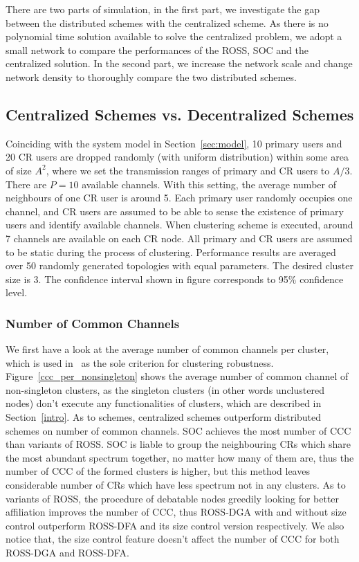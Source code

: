 There are two parts of simulation, in the first part, we investigate the gap between the distributed schemes with the centralized scheme.
As there is no polynomial time solution available to solve the centralized problem, we adopt a small network to compare the performances of the ROSS, SOC and the centralized solution.
In the second part, we increase the network scale and change network density to thoroughly compare the two distributed schemes.
\subsection{Centralized Schemes vs. Decentralized Schemes}
Coinciding with the system model in Section~\ref{sec:model}, 10 primary users and 20 CR users are dropped randomly (with uniform distribution) within some area of size $A^{2}$, where we set the transmission ranges of primary and CR users to $A/3$. There are $P=10$ available channels. 
With this setting, the average number of neighbours of one CR user is around 5.
Each primary user randomly occupies one channel, and CR users are assumed to be able to sense the existence of primary users and identify available channels.
When clustering scheme is executed, around 7 channels are available on each CR node.
All primary and CR users are assumed to be static during the process of clustering.
Performance results are averaged over 50 randomly generated topologies with equal parameters.
The desired cluster size is 3.
The confidence interval shown in figure corresponds to 95\% confidence level.

\subsubsection*{Number of Common Channels}
\label{ccc_20}
We first have a look at the average number of common channels per cluster, which is used in~\cite{LIU_TMC11_2} as the sole criterion for clustering robustness.
Figure~\ref{ccc_per_nonsingleton} shows the average number of common channel of non-singleton clusters, as the singleton clusters (in other words unclustered nodes) don't execute any functionalities of clusters, which are described in Section~\ref{intro}.
As to schemes, centralized schemes outperform distributed schemes on number of common channels.
SOC achieves the most number of CCC than variants of ROSS.
SOC is liable to group the neighbouring CRs which share the most abundant spectrum together, no matter how many of them are, thus the number of CCC of the formed clusters is higher, but this method leaves considerable number of CRs which have less spectrum not in any clusters.
As to variants of ROSS, the procedure of debatable nodes greedily looking for better affiliation improves the number of CCC, thus ROSS-DGA with and without size control outperform ROSS-DFA and its size control version respectively.
We also notice that, the size control feature doesn't affect the number of CCC for both ROSS-DGA and ROSS-DFA.


